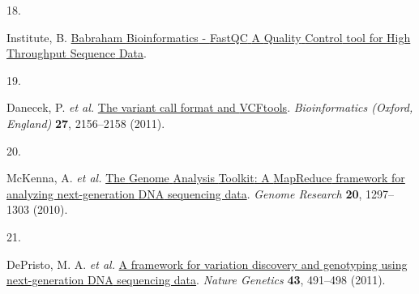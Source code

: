 \documentclass[
  letterpaper,
  DIV=11,
  numbers=noendperiod]{scrreprt}
\newlength{\cslhangindent}
\newlength{\csllabelwidth}
\newenvironment{CSLReferences}[2] %
 {\begin{list}{}{%
  \setlength{\itemindent}{0pt}
  \setlength{\leftmargin}{0pt}
  \setlength{\parsep}{0pt}
  \ifodd #1
   \setlength{\leftmargin}{\cslhangindent}
   \setlength{\itemindent}{-1\cslhangindent}
  \fi
  \setlength{\itemsep}{#2\baselineskip}}}
 {\end{list}}
\newcommand{\CSLLeftMargin}[1]{\parbox[t]{\csllabelwidth}{\strut#1\strut}}
\newcommand{\CSLRightInline}[1]{\parbox[t]{\linewidth - \csllabelwidth}{\strut#1\strut}}
\begin{document}
\begin{CSLReferences}{0}{0}
\CSLLeftMargin{18. }%
\CSLRightInline{Institute, B.
\href{https://www.bioinformatics.babraham.ac.uk/projects/fastqc/}{Babraham
{Bioinformatics} - {FastQC} {A} {Quality} {Control} tool for {High}
{Throughput} {Sequence} {Data}}.}

\CSLLeftMargin{19. }%
\CSLRightInline{Danecek, P. \emph{et al.}
\href{https://doi.org/10.1093/bioinformatics/btr330}{The variant call
format and {VCFtools}}. \emph{Bioinformatics (Oxford, England)}
\textbf{27}, 2156--2158 (2011).}

\CSLLeftMargin{20. }%
\CSLRightInline{McKenna, A. \emph{et al.}
\href{https://doi.org/10.1101/gr.107524.110}{The {Genome} {Analysis}
{Toolkit}: A {MapReduce} framework for analyzing next-generation {DNA}
sequencing data}. \emph{Genome Research} \textbf{20}, 1297--1303
(2010).}

\CSLLeftMargin{21. }%
\CSLRightInline{DePristo, M. A. \emph{et al.}
\href{https://doi.org/10.1038/ng.806}{A framework for variation
discovery and genotyping using next-generation {DNA} sequencing data}.
\emph{Nature Genetics} \textbf{43}, 491--498 (2011).}

\end{CSLReferences}
\end{document}
